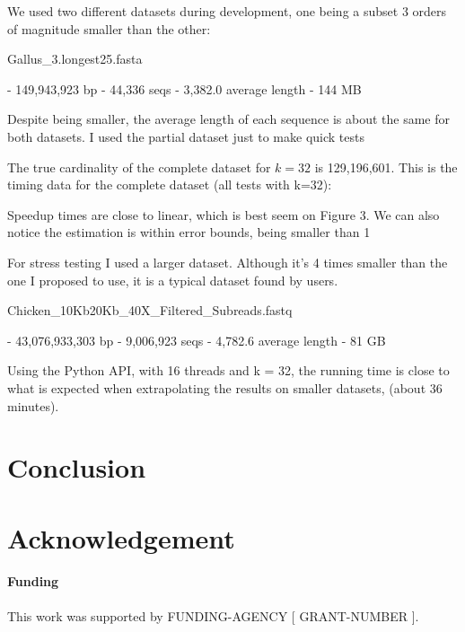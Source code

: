 \documentclass{bioinfo}
\begin{document}
We used two different datasets during development,
one being a subset 3 orders of magnitude smaller than the other:

Gallus\_3.longest25.fasta

  - 149,943,923 bp
  - 44,336 seqs
  - 3,382.0 average length
  - 144 MB

Despite being smaller,
the average length of each sequence is about the same for both datasets.
I used the partial dataset just to make quick tests

The true cardinality of the complete dataset for $k=32$ is 129,196,601.
This is the timing data for the complete dataset (all tests with k=32):

Speedup times are close to linear,
which is best seem on Figure 3.
We can also notice the estimation is within error bounds,
being smaller than 1%

For stress testing I used a larger dataset.
Although it's 4 times smaller than the one I proposed to use,
it is a typical dataset found by users.

Chicken\_10Kb20Kb\_40X\_Filtered\_Subreads.fastq

  - 43,076,933,303 bp
  - 9,006,923 seqs
  - 4,782.6 average length
  - 81 GB

Using the Python API, with 16 threads and k = 32,
the running time is close to what is expected when extrapolating the
results on smaller datasets,
(about 36 minutes).


\section{Conclusion}

\section*{Acknowledgement}

\paragraph{Funding\textcolon} This work was supported by FUNDING-AGENCY [ GRANT-NUMBER ].


%
%
%
%
%
%
%

\end{document}
